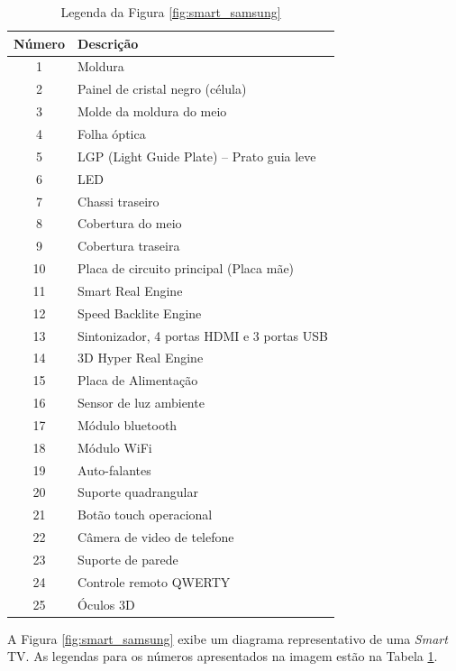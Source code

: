 \begin{table}[ht]
	\centering
	\caption{Legenda da Figura \ref{fig:smart_samsung}}
	\label{tab:smart}
	\begin{tabular}{c l}
		\hline
		Número & Descrição \\
		\hline
		1 & Moldura \\
		2 & Painel de cristal negro (célula) \\
		3 & Molde da moldura do meio \\
		4 & Folha óptica \\
		5 & LGP (Light Guide Plate) -- Prato guia leve \\
		6 & LED \\
		7 & Chassi traseiro \\
		8 & Cobertura do meio \\
		9 & Cobertura traseira \\
		10 & Placa de circuito principal (Placa mãe) \\
		11 & Smart Real Engine \\
		12 & Speed Backlite Engine \\
		13 & Sintonizador, 4 portas HDMI e 3 portas USB \\
		14 & 3D Hyper Real Engine \\
		15 & Placa de Alimentação \\
		16 & Sensor de luz ambiente \\
		17 & Módulo bluetooth \\
		18 & Módulo WiFi \\
		19 & Auto-falantes \\
		20 & Suporte quadrangular \\
		21 & Botão touch operacional \\
		22 & Câmera de video de telefone \\
		23 & Suporte de parede \\
		24 & Controle remoto QWERTY \\
		25 & Óculos 3D \\
		\hline
	\end{tabular}
\end{table}

A Figura \ref{fig:smart_samsung} exibe um diagrama representativo de uma \emph{Smart} TV. As legendas para os números apresentados na imagem estão na Tabela \ref{tab:smart}.

